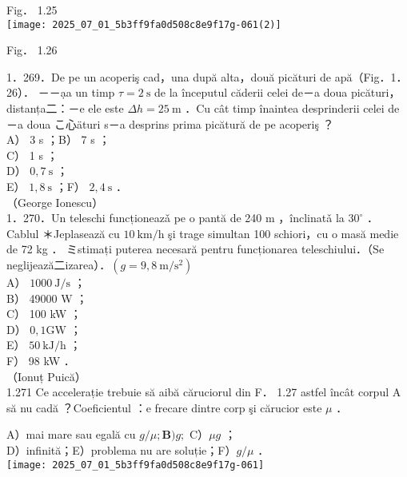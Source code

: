 {Fig． 1.25\\
\texttt{[image: 2025\_07\_01\_5b3ff9fa0d508c8e9f17g-061(2)]}

Fig． 1.26

1．269．De pe un acoperiş cad，una după alta，două picături de apă（Fig．1．26）． －－ạa un timp $\tau=2 \mathrm{~s}$ de la începutul căderii celei de－a doua picături，distanța二：－e ele este $\Delta h=25 \mathrm{~m}$ ．Cu cât timp înaintea desprinderii celei de－a doua こ心äturi s－a desprins prima picătură de pe acoperiş ？\\
A） 3 s ；B） 7 s ；\\
C） 1 s ；\\
D） $0,7 \mathrm{~s}$ ；\\
E） $1,8 \mathrm{~s}$ ；F） $2,4 \mathrm{~s}$ ．\\
（George Ionescu）\\
1．270．Un teleschi funcționeazǎ pe o pantă de 240 m ，înclinatǎ la $30^{\circ}$ ．Cablul ＊Jeplasează cu $10 \mathrm{~km} / \mathrm{h}$ şi trage simultan 100 schiori，cu o masă medie de 72 kg ． ミstimați puterea necesară pentru funcționarea teleschiului．（Se neglijează二izarea）．$\left(g=9,8 \mathrm{~m} / \mathrm{s}^{2}\right)$\\
A） $1000 \mathrm{~J} / \mathrm{s}$ ；\\
B） 49000 W ；\\
C） 100 kW ；\\
D） $0,1 \mathrm{GW}$ ；\\
E） $50 \mathrm{~kJ} / \mathrm{h}$ ；\\
F） 98 kW ．\\
（Ionuț Puică）\\
1.271 Ce accelerație trebuie să aibă căruciorul din F． 1.27 astfel încât corpul A să nu cadă ？Coeficientul ：e frecare dintre corp şi cărucior este $\mu$ ．

A）mai mare sau egală cu $g / \mu ; \mathbf{B}) g ;$ C）$\mu g$ ；\\
D）infinită；E）problema nu are soluție；F）$g / \mu$ ．\\
\texttt{[image: 2025\_07\_01\_5b3ff9fa0d508c8e9f17g-061]}

}
